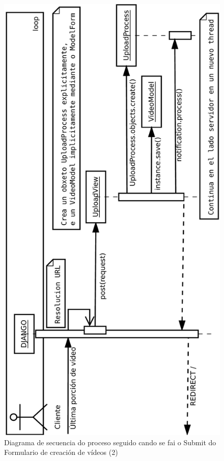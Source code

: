         \begin{figure}[htp]
        \begin{center}
            \includegraphics[scale=0.45]{figures/FinSubidaVideo.pdf}
            \caption{Diagrama de secuencia do proceso seguido cando se fai o Submit do Formulario 
            de creación de vídeos (2)}
        \label{fig:FinSubidaVideo2}
        \end{center}
        \end{figure}
                
